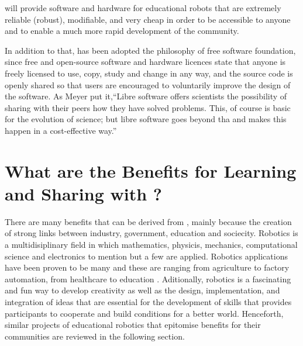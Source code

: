 {\librER} will provide software and hardware for educational robots that are extremely 
reliable (robust), modifiable, and very cheap in order to be accessible to anyone and 
to enable a much more rapid development of the community.

In addition to that, {\librER} has been adopted the philosophy of free software 
foundation, since free and open-source software and hardware licences state that anyone 
is freely licensed to use, copy, study and change in any way, and the source code is 
openly shared so that users are encouraged to voluntarily improve the design of the 
software. As Meyer \cite{Meyer2003} put it,``Libre software offers scientists the 
possibility of sharing with their peers how they have solved problems. This, of course 
is basic for the evolution of science; but libre software goes beyond tha and makes 
this happen in a cost-effective way.'' 

\section{What are the Benefits for Learning and Sharing with {\librER}?}
There are many benefits that can be derived from {\librER}, mainly because the 
creation of strong links between industry, government, education and sociecity. 
Robotics is a multidisiplinary field in which mathematics, physicis, mechanics, 
computational science and electronics to mention but a few are applied.
Robotics applications have been proven to be many and these are ranging from 
agriculture to factory automation, from healthcare to education \cite{ashesirobotics2013}. 
Aditionally, robotics is a fascinating and fun way to develop creativity as well as the 
design, implementation, and integration of ideas that are essential for the development 
of skills that provides participants to cooperate and build conditions for a better world. 
Henceforth, similar projects of educational robotics that epitomise benefits for their 
communities are reviewed in the following section.

